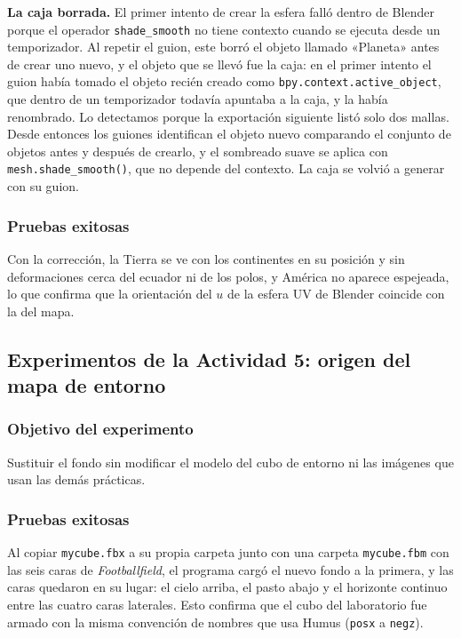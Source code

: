 \textbf{La caja borrada.} El primer intento de crear la esfera falló dentro de Blender porque el operador \texttt{shade\_smooth} no tiene contexto cuando se ejecuta desde un temporizador. Al repetir el guion, este borró el objeto llamado «Planeta» antes de crear uno nuevo, y el objeto que se llevó fue la caja: en el primer intento el guion había tomado el objeto recién creado como \texttt{bpy.context.active\_object}, que dentro de un temporizador todavía apuntaba a la caja, y la había renombrado. Lo detectamos porque la exportación siguiente listó solo dos mallas. Desde entonces los guiones identifican el objeto nuevo comparando el conjunto de objetos antes y después de crearlo, y el sombreado suave se aplica con \texttt{mesh.shade\_smooth()}, que no depende del contexto. La caja se volvió a generar con su guion.

\subsubsection{Pruebas exitosas}
Con la corrección, la Tierra se ve con los continentes en su posición y sin deformaciones cerca del ecuador ni de los polos, y América no aparece espejeada, lo que confirma que la orientación del $u$ de la esfera UV de Blender coincide con la del mapa.

\subsection{Experimentos de la Actividad 5: origen del mapa de entorno}

\subsubsection{Objetivo del experimento}
Sustituir el fondo sin modificar el modelo del cubo de entorno ni las imágenes que usan las demás prácticas.

\subsubsection{Pruebas exitosas}
Al copiar \texttt{mycube.fbx} a su propia carpeta junto con una carpeta \texttt{mycube.fbm} con las seis caras de \textit{Footballfield}, el programa cargó el nuevo fondo a la primera, y las caras quedaron en su lugar: el cielo arriba, el pasto abajo y el horizonte continuo entre las cuatro caras laterales. Esto confirma que el cubo del laboratorio fue armado con la misma convención de nombres que usa Humus (\texttt{posx} a \texttt{negz}).


